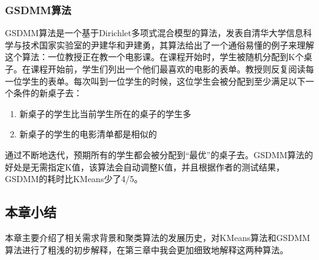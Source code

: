 \subsubsection{GSDMM算法}
GSDMM算法是一个基于Dirichlet多项式混合模型的算法，发表自清华大学信息科学与技术国家实验室的尹建华和尹建勇\cite{Yin:2014:DMM:2623330.2623715}，其算法给出了一个通俗易懂的例子来理解这个算法：一位教授正在教一个电影课。在课程开始时，学生被随机分配到K个桌子。在课程开始前，学生们列出一个他们最喜欢的电影的表单。教授则反复阅读每一位学生的表单。每次叫到一位学生的时候，这位学生会被分配到至少满足以下一个条件的新桌子去：
\begin{enumerate}
	\item 新桌子的学生比当前学生所在的桌子的学生多
	\item 新桌子的学生的电影清单都是相似的
\end{enumerate}
通过不断地迭代，预期所有的学生都会被分配到“最优”的桌子去。GSDMM算法的好处是无需指定K值，该算法会自动调整K值，并且根据作者的测试结果，GSDMM的耗时比KMeans少了4/5。

\subsection{本章小结}

本章主要介绍了相关需求背景和聚类算法的发展历史，对KMeans算法和GSDMM算法进行了粗浅的初步解释，在第三章中我会更加细致地解释这两种算法。
